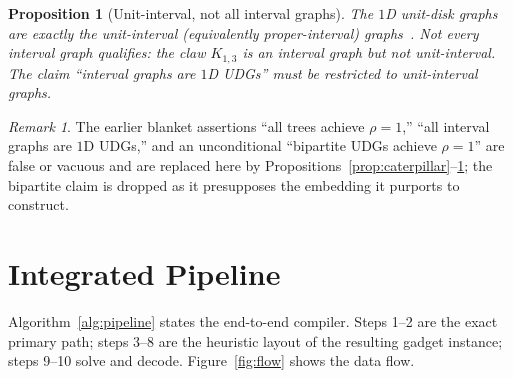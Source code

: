 \documentclass[11pt]{article}
\newtheorem{proposition}[theorem]{Proposition}
\theoremstyle{definition}
\theoremstyle{remark}
\newtheorem{remark}[theorem]{Remark}
\begin{document}
\begin{proposition}[Unit-interval, not all interval graphs]
\label{prop:unitinterval}
The $1$D unit-disk graphs are exactly the \emph{unit-interval} (equivalently
proper-interval) graphs~\cite{Roberts1969,Golumbic1980}. Not every interval graph
qualifies: the claw $K_{1,3}$ is an interval graph but not unit-interval. The claim
``interval graphs are $1$D UDGs'' must be restricted to unit-interval graphs.
\end{proposition}

\begin{remark}
The earlier blanket assertions ``all trees achieve $\rho=1$,'' ``all interval graphs are
$1$D UDGs,'' and an unconditional ``bipartite UDGs achieve $\rho=1$'' are false or
vacuous and are replaced here by
Propositions~\ref{prop:caterpillar}--\ref{prop:unitinterval}; the bipartite claim is
dropped as it presupposes the embedding it purports to construct.
\end{remark}

\section{Integrated Pipeline}
\label{sec:pipeline}

Algorithm~\ref{alg:pipeline} states the end-to-end compiler. Steps 1--2 are the exact
primary path; steps 3--8 are the heuristic layout of the resulting gadget instance;
steps 9--10 solve and decode. Figure~\ref{fig:flow} shows the data flow.
\end{document}
